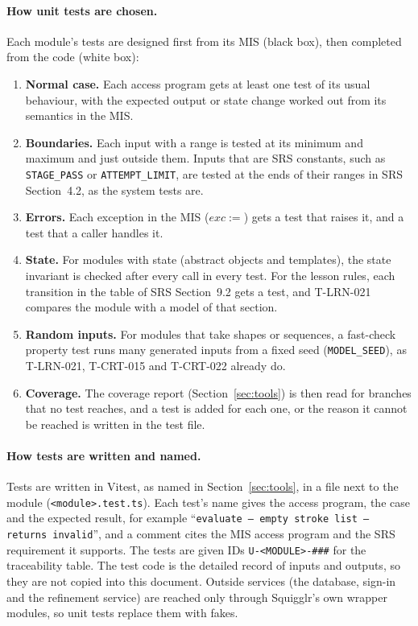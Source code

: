 \documentclass[12pt, titlepage]{article}
\begin{document}
\paragraph{How unit tests are chosen.} Each module's tests are designed first
from its MIS (black box), then completed from the code (white box):
\begin{enumerate}
\item \textbf{Normal case.} Each access program gets at least one test of its
usual behaviour, with the expected output or state change worked out from
its semantics in the MIS.
\item \textbf{Boundaries.} Each input with a range is tested at its minimum
and maximum and just outside them. Inputs that are SRS constants, such as
\texttt{STAGE\_PASS} or \texttt{ATTEMPT\_LIMIT}, are tested at the ends of
their ranges in SRS Section~4.2, as the system tests are.
\item \textbf{Errors.} Each exception in the MIS ($exc :=$) gets a test that
raises it, and a test that a caller handles it.
\item \textbf{State.} For modules with state (abstract objects and
templates), the state invariant is checked after every call in every test.
For the lesson rules, each transition in the table of SRS Section~9.2 gets a
test, and T-LRN-021 compares the module with a model of that section.
\item \textbf{Random inputs.} For modules that take shapes or sequences, a
fast-check property test runs many generated inputs from a fixed seed
(\texttt{MODEL\_SEED}), as T-LRN-021, T-CRT-015 and T-CRT-022 already do.
\item \textbf{Coverage.} The coverage report (Section~\ref{sec:tools}) is then
read for branches that no test reaches, and a test is added for each one, or
the reason it cannot be reached is written in the test file.
\end{enumerate}

\paragraph{How tests are written and named.} Tests are written in Vitest, as
named in Section~\ref{sec:tools}, in a file next to the module
(\texttt{<module>.test.ts}). Each test's name gives the access program, the
case and the expected result, for example ``\texttt{evaluate -- empty stroke
list -- returns invalid}'', and a comment cites the MIS access program
and the SRS requirement it supports. The tests are given IDs
\texttt{U-<MODULE>-\#\#\#} for the traceability table. The test code is the
detailed record of inputs and outputs, so they are not copied into this
document. Outside services (the database, sign-in and the refinement
service) are reached only through Squigglr's own wrapper modules, so unit
tests replace them with fakes.
\end{document}
